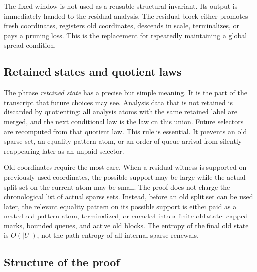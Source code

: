 \documentclass[11pt]{article}
\theoremstyle{remark}
\begin{document}
The fixed window is not used as a reusable structural invariant.  Its output is
immediately handed to the residual analysis.  The residual block either
promotes fresh coordinates, registers old coordinates, descends in scale,
terminalizes, or pays a pruning loss.  This is the replacement for repeatedly
maintaining a global spread condition.

\subsection*{Retained states and quotient laws}

The phrase \emph{retained state} has a precise but simple meaning.  It is the
part of the transcript that future choices may see.  Analysis data that is not
retained is discarded by quotienting: all analysis atoms with the same retained
label are merged, and the next conditional law is the law on this union.  Future
selectors are recomputed from that quotient law.  This rule is essential.  It
prevents an old sparse set, an equality-pattern atom, or an order of queue
arrival from silently reappearing later as an unpaid selector.

Old coordinates require the most care.  When a residual witness is supported on
previously used coordinates, the possible support may be large while the actual
split set on the current atom may be small.  The proof does not charge the
chronological list of actual sparse sets.  Instead, before an old split set can
be used later, the relevant equality pattern on its possible support is either
paid as a nested old-pattern atom, terminalized, or encoded into a finite old
state: capped marks, bounded queues, and active old blocks.  The entropy of the
final old state is $O(|U|)$, not the path entropy of all internal sparse
renewals.

\subsection*{Structure of the proof}
\end{document}
